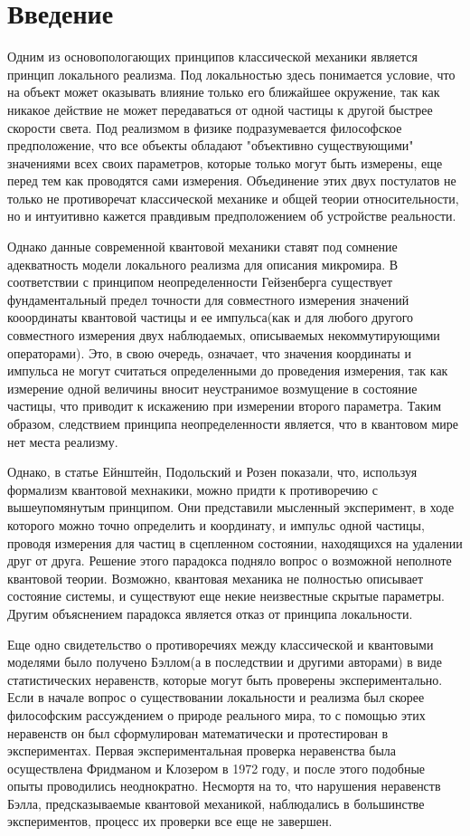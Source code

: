 \documentclass[11pt]{article}
\begin{document}
\section*{Введение}
Одним из основопологающих принципов классической механики является принцип локального реализма. Под локальностью здесь понимается условие, что на объект может оказывать влияние только его ближайшее окружение, так как никакое действие не может передаваться от одной частицы к другой быстрее скорости света. Под реализмом в физике подразумевается философское предположение, что все объекты обладают "объективно существующими" значениями всех своих параметров, которые только могут быть измерены, еще перед тем как проводятся сами измерения. Объединение этих двух постулатов не только не противоречат классической механике и общей теории относительности, но и интуитивно кажется правдивым предположением об устройстве реальности.

Однако данные современной квантовой механики ставят под сомнение адекватность модели локального реализма для описания микромира. В соответствии с принципом неопределенности Гейзенберга существует фундаментальный предел точности для совместного измерения значений кооординаты квантовой частицы и ее импульса(как и для любого другого совместного измерения двух наблюдаемых, описываемых некоммутирующими операторами). Это, в свою очередь, означает, что значения координаты и импульса не могут считаться определенными до проведения измерения, так как измерение одной величины вносит неустранимое возмущение в состояние частицы, что приводит к искажению при измерении второго параметра. Таким образом, следствием принципа неопределенности является, что в квантовом мире нет места реализму.

Однако, в статье \cite{EPR} Ейнштейн, Подольский и Розен показали, что, используя формализм квантовой мехнакики, можно придти к противоречию с вышеупомянутым принципом. Они представили мысленный эксперимент, в ходе которого можно точно определить и координату, и импульс одной частицы, проводя измерения для частиц в сцепленном состоянии, находящихся на удалении друг от друга. Решение этого парадокса подняло вопрос о возможной неполноте квантовой теории. Возможно, квантовая механика не полностью описывает состояние системы, и существуют еще некие неизвестные скрытые параметры. Другим объяснением парадокса является отказ от принципа локальности.

Еще одно свидетельство о противоречиях между классической и квантовыми моделями было получено Бэллом(а в последствии и другими авторами) в виде статистических неравенств, которые могут быть проверены экспериментально. Если в начале вопрос о существовании локальности и реализма был скорее философским рассуждением о природе реального мира, то с помощью этих неравенств он был сформулирован математически и протестирован в экспериментах. Первая экспериментальная проверка неравенства была осуществлена Фридманом и Клозером в 1972 году, и после этого подобные опыты проводились неоднократно. Несмортя на то, что нарушения неравенств Бэлла, предсказываемые квантовой механикой, наблюдались в большинстве экспериментов, процесс их проверки все еще не завершен.
\end{document}
